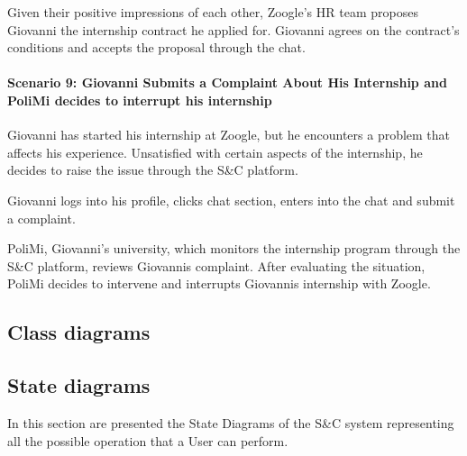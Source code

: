 Given their positive impressions of each other, Zoogle's HR team
proposes Giovanni the internship contract he applied for. Giovanni
agrees on the contract's conditions and accepts the proposal through the
chat.

\paragraph{Scenario 9: Giovanni Submits a Complaint About His Internship
and PoliMi decides to interrupt his internship
}Giovanni has started his internship at Zoogle, but he encounters a
problem that affects his experience. Unsatisfied with certain aspects of
the internship, he decides to raise the issue through the S\&C platform.

Giovanni logs into his profile, clicks chat section, enters into the
chat and submit a complaint.~

PoliMi, Giovanni's university, which monitors the internship program
through the S\&C platform, reviews Giovanni\textquotesingle s complaint.
After evaluating the situation, PoliMi decides to intervene and
interrupts Giovanni\textquotesingle s internship with Zoogle.

\subsection{Class diagrams}
\label{subsec:class_diagrams}%

\subsection{State diagrams}
\label{subsec:state_diagrams}%

In this section are presented the State Diagrams of the S\&C system
representing all the possible operation that a User can perform.

